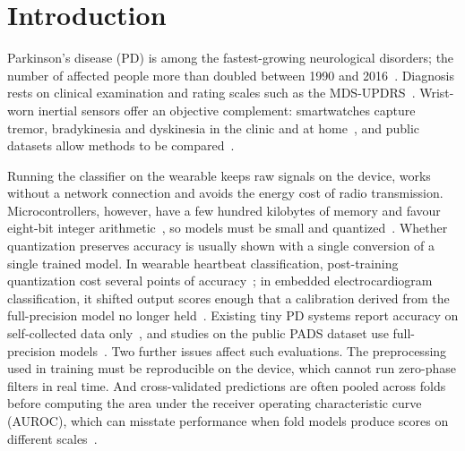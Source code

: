 \documentclass[preprint,12pt]{elsarticle}
\begin{document}
\linenumbers

\section{Introduction}
\label{sec:intro}
Parkinson's disease (PD) is among the fastest-growing neurological disorders; the number of affected people more than doubled between 1990 and 2016~\cite{GBD2018PD,Dorsey2018}. Diagnosis rests on clinical examination and rating scales such as the MDS-UPDRS~\cite{Goetz2008,Postuma2015}. Wrist-worn inertial sensors offer an objective complement: smartwatches capture tremor, bradykinesia and dyskinesia in the clinic and at home~\cite{Rovini2017,Sigcha2023rev,Powers2021,Lipsmeier2018}, and public datasets allow methods to be compared~\cite{Varghese2024,Bot2016,Monipar2023}.

Running the classifier on the wearable keeps raw signals on the device, works without a network connection and avoids the energy cost of radio transmission. Microcontrollers, however, have a few hundred kilobytes of memory and favour eight-bit integer arithmetic~\cite{David2021,Lin2020,Banbury2021,Ray2022}, so models must be small and quantized~\cite{Jacob2018,Krishnamoorthi2018,Nagel2021}. Whether quantization preserves accuracy is usually shown with a single conversion of a single trained model. In wearable heartbeat classification, post-training quantization cost several points of accuracy~\cite{Nikandish2026}; in embedded electrocardiogram classification, it shifted output scores enough that a calibration derived from the full-precision model no longer held~\cite{ElAllam2026}. Existing tiny PD systems report accuracy on self-collected data only~\cite{Parikh2026}, and studies on the public PADS dataset use full-precision models~\cite{Varghese2024,Zannat2026}. Two further issues affect such evaluations. The preprocessing used in training must be reproducible on the device, which cannot run zero-phase filters in real time. And cross-validated predictions are often pooled across folds before computing the area under the receiver operating characteristic curve (AUROC), which can misstate performance when fold models produce scores on different scales~\cite{Forman2010,Airola2011}.
\end{document}
